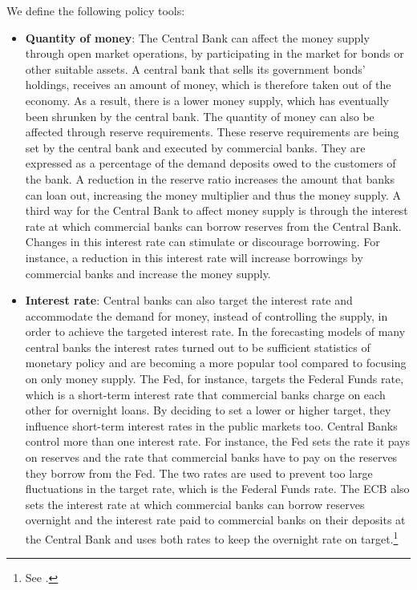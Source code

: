 \documentclass[11pt,a4paper,oneside]{book}
\begin{document}
We define the following policy tools:
\begin{itemize}
  \item \textbf{Quantity of money}: The Central Bank can affect the money supply through open market operations, by participating in the market for bonds or other suitable assets. A central bank that sells its government bonds' holdings, receives an amount of money, which is therefore taken out of the economy. As a result, there is a lower money supply, which has eventually been shrunken by the central bank. The quantity of money can also be affected through reserve requirements. These reserve requirements are being set by the central bank and executed by commercial banks. They are expressed as a percentage of the demand deposits owed to the customers of the bank. A reduction in the reserve ratio increases the amount that banks can loan out, increasing the money multiplier and thus the money supply. A third way for the Central Bank to affect money supply is through the interest rate at which commercial banks can borrow reserves from the Central Bank. Changes in this interest rate can stimulate or discourage borrowing. For instance, a reduction in this interest rate will increase borrowings by commercial banks and increase the money supply.
  \item \textbf{Interest rate}: Central banks can also target the interest rate and accommodate the demand for money, instead of controlling the supply, in order to achieve the targeted interest rate. In the forecasting models of many central banks the interest rates turned out to be sufficient statistics of monetary policy and are becoming a more popular tool compared to focusing on only money supply. The Fed, for instance, targets the Federal Funds rate, which is a short-term interest rate that commercial banks charge on each other for overnight loans. By deciding to set a lower or higher target, they influence short-term interest rates in the public markets too. Central Banks control more than one interest rate. For instance, the Fed sets the rate it pays on reserves and the rate that commercial banks have to pay on the reserves they borrow from the Fed. The two rates are used to prevent too large fluctuations in the target rate, which is the Federal Funds rate. The ECB also sets the interest rate at which commercial banks can borrow reserves overnight and the interest rate paid to commercial banks on their deposits at the Central Bank and uses both rates to keep the overnight rate on target.\footnote{See \citep*[pp. 411-417]{Mishkin_2016}.}

\end{itemize}
\end{document}

